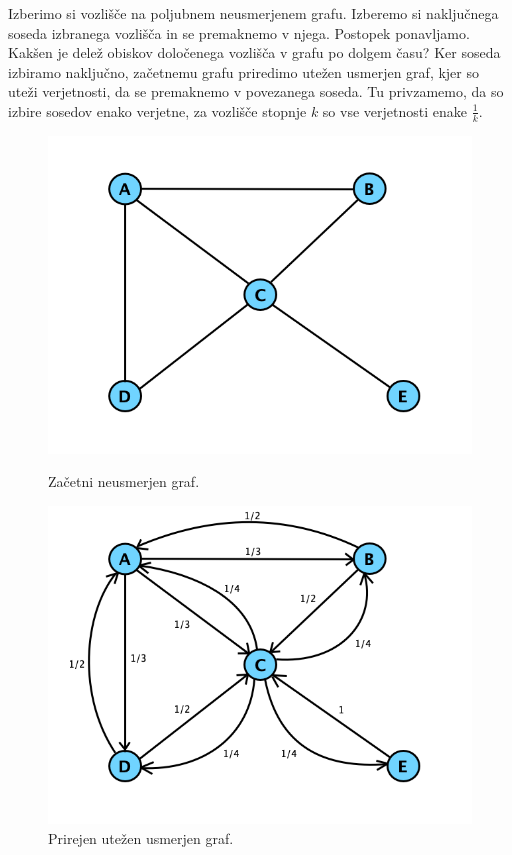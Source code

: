 \documentclass[mat1]{fmfdelo}
\begin{document}
\begin{zgled}
    Izberimo si vozlišče na poljubnem neusmerjenem grafu. Izberemo si naključnega soseda izbranega vozlišča in se premaknemo v njega. Postopek ponavljamo. Kakšen je delež obiskov določenega vozlišča v grafu po dolgem času? Ker soseda izbiramo naključno, začetnemu grafu priredimo utežen usmerjen graf, kjer so uteži verjetnosti, da se premaknemo v povezanega soseda. Tu privzamemo, da so izbire sosedov enako verjetne, za vozlišče stopnje $k$ so vse verjetnosti enake $\frac{1}{k}$.
    \begin{figure}[!htb]
        \centering
        \begin{minipage}{0.5\textwidth}
            \centering
            \includegraphics[width=\textwidth]{grafUndir.png}
            \caption{Začetni neusmerjen graf.}
        \end{minipage}
        \hspace{-30pt}
        \begin{minipage}{0.5\textwidth}
            \centering
            \includegraphics[width=\textwidth]{grafDir.png}
            \caption{Prirejen utežen usmerjen graf.}
        \end{minipage}
    \end{figure}


\end{zgled}
\end{document}
